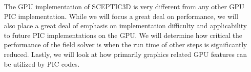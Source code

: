 

The GPU implementation of SCEPTIC3D is very different from any other GPU PIC implementation. While we will focus a great deal on performance, we will also place a great deal of emphasis on implementation difficulty and applicability to future PIC implementations on the GPU. We will determine how critical the performance of the field solver is when the run time of other steps is significantly reduced. Lastly, we will look at how primarily graphics related GPU features can be utilized by PIC codes. 













